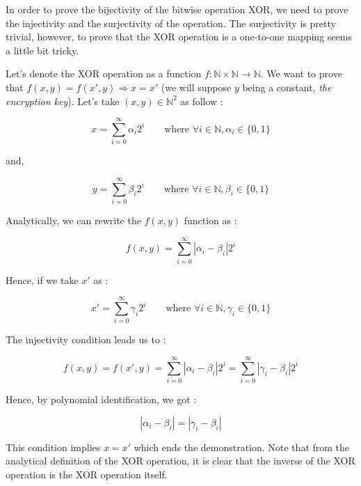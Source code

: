 In order to prove the bijectivity of the bitwise operation XOR, we need to prove the injectivity and the surjectivity of the operation. The surjectivity is pretty trivial, however, to prove that the XOR operation is a one-to-one mapping seems a little bit tricky. 

Let's denote the XOR operation as a function $f:\mathbb{N} \times \mathbb{N} \rightarrow \mathbb{N}$. We want to prove that $f(x,y)=f(x',y) \Rightarrow x=x'$ (we will suppose $y$ being a constant, \textit{the encryption key}). Let's take $(x,y) \in \mathbb{N}^2$ as follow :

\begin{equation}
	x = \sum_{i=0}^{\infty}\alpha_i 2^i \qquad \text{where } \forall i \in \mathbb{N}, \alpha_i \in \{0,1\}
\end{equation} 

and,

\begin{equation}
	y = \sum_{i=0}^{\infty}\beta_i 2^i \qquad \text{where } \forall i \in \mathbb{N}, \beta_i \in \{0,1\}
\end{equation} 

Analytically, we can rewrite the $f(x,y)$ function as :

\begin{equation}
	f(x,y)=\sum_{i=0}^{\infty} |\alpha_i - \beta_i| 2^i
\end{equation}

Hence, if we take $x'$ as :

\begin{equation}
	x' = \sum_{i=0}^{\infty}\gamma_i 2^i \qquad \text{where } \forall i \in \mathbb{N}, \gamma_i \in \{0,1\}
\end{equation} 

The injectivity condition leads us to :

\begin{equation}
	f(x,y)=f(x', y)=\sum_{i=0}^{\infty} |\alpha_i - \beta_i| 2^i=\sum_{i=0}^{\infty} |\gamma_i - \beta_i|2^i
\end{equation}

Hence, by polynomial identification, we got :

\begin{equation}
	|\alpha_i - \beta_i| = |\gamma_i - \beta_i|
\end{equation}

This condition implies $x=x'$ which ends the demonstration.
Note that from the analytical definition of the XOR operation, it is clear that the inverse of the XOR operation is the XOR operation itself.
